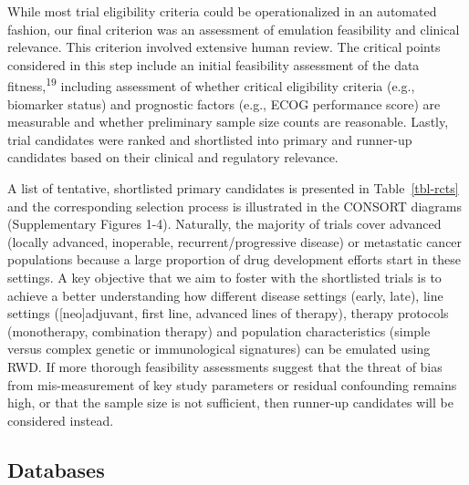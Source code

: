 \documentclass[
  letterpaper,
  DIV=11,
  numbers=noendperiod]{scrartcl}
\begin{document}
While most trial eligibility criteria could be operationalized in an
automated fashion, our final criterion was an assessment of emulation
feasibility and clinical relevance. This criterion involved extensive
human review. The critical points considered in this step include an
initial feasibility assessment of the data fitness,\textsuperscript{19}
including assessment of whether critical eligibility criteria (e.g.,
biomarker status) and prognostic factors (e.g., ECOG performance score)
are measurable and whether preliminary sample size counts are
reasonable. Lastly, trial candidates were ranked and shortlisted into
primary and runner-up candidates based on their clinical and regulatory
relevance.

A list of tentative, shortlisted primary candidates is presented in
Table~\ref{tbl-rcts} and the corresponding selection process is
illustrated in the CONSORT diagrams (Supplementary Figures 1-4).
Naturally, the majority of trials cover advanced (locally advanced,
inoperable, recurrent/progressive disease) or metastatic cancer
populations because a large proportion of drug development efforts start
in these settings. A key objective that we aim to foster with the
shortlisted trials is to achieve a better understanding how different
disease settings (early, late), line settings ({[}neo{]}adjuvant, first
line, advanced lines of therapy), therapy protocols (monotherapy,
combination therapy) and population characteristics (simple versus
complex genetic or immunological signatures) can be emulated using RWD.
If more thorough feasibility assessments suggest that the threat of bias
from mis-measurement of key study parameters or residual confounding
remains high, or that the sample size is not sufficient, then runner-up
candidates will be considered instead.

\subsection{Databases}\label{databases}
\end{document}

